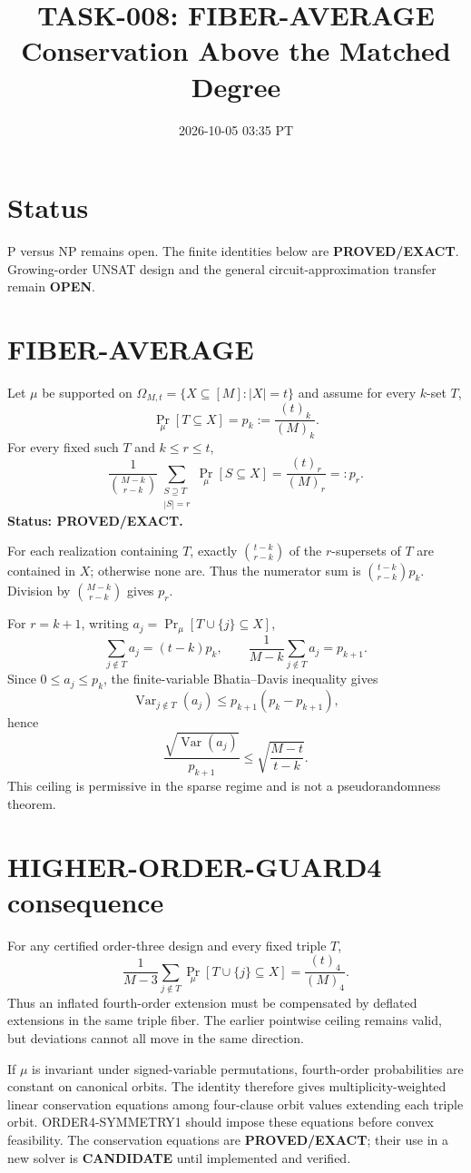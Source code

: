 \documentclass[11pt]{article}
\title{TASK-008: FIBER-AVERAGE Conservation Above the Matched Degree}
\date{2026-10-05 03:35 PT}
\begin{document}
\maketitle
\section*{Status}
P versus NP remains open. The finite identities below are \textbf{PROVED/EXACT}. Growing-order UNSAT design and the general circuit-approximation transfer remain \textbf{OPEN}.

\section*{FIBER-AVERAGE}
Let $\mu$ be supported on $\Omega_{M,t}=\{X\subseteq[M]:|X|=t\}$ and assume for every $k$-set $T$,
\[
\Pr_\mu[T\subseteq X]=p_k:=\frac{(t)_k}{(M)_k}.
\]
For every fixed such $T$ and $k\le r\le t$,
\[
\boxed{
\frac{1}{\binom{M-k}{r-k}}
\sum_{\substack{S\supseteq T\\|S|=r}}
\Pr_\mu[S\subseteq X]
=
\frac{(t)_r}{(M)_r}=:p_r.
}
\]
\textbf{Status: PROVED/EXACT.}

For each realization containing $T$, exactly $\binom{t-k}{r-k}$ of the $r$-supersets of $T$ are contained in $X$; otherwise none are. Thus the numerator sum is $\binom{t-k}{r-k}p_k$. Division by $\binom{M-k}{r-k}$ gives $p_r$.

For $r=k+1$, writing $a_j=\Pr_\mu[T\cup\{j\}\subseteq X]$,
\[
\sum_{j\notin T}a_j=(t-k)p_k,
\qquad
\frac1{M-k}\sum_{j\notin T}a_j=p_{k+1}.
\]
Since $0\le a_j\le p_k$, the finite-variable Bhatia--Davis inequality gives
\[
\operatorname{Var}_{j\notin T}(a_j)
\le p_{k+1}(p_k-p_{k+1}),
\]
hence
\[
\frac{\sqrt{\operatorname{Var}(a_j)}}{p_{k+1}}
\le \sqrt{\frac{M-t}{t-k}}.
\]
This ceiling is permissive in the sparse regime and is not a pseudorandomness theorem.

\section*{HIGHER-ORDER-GUARD4 consequence}
For any certified order-three design and every fixed triple $T$,
\[
\frac1{M-3}\sum_{j\notin T}
\Pr_\mu[T\cup\{j\}\subseteq X]
=
\frac{(t)_4}{(M)_4}.
\]
Thus an inflated fourth-order extension must be compensated by deflated extensions in the same triple fiber. The earlier pointwise ceiling remains valid, but deviations cannot all move in the same direction.

If $\mu$ is invariant under signed-variable permutations, fourth-order probabilities are constant on canonical orbits. The identity therefore gives multiplicity-weighted linear conservation equations among four-clause orbit values extending each triple orbit. ORDER4-SYMMETRY1 should impose these equations before convex feasibility. The conservation equations are \textbf{PROVED/EXACT}; their use in a new solver is \textbf{CANDIDATE} until implemented and verified.
\end{document}

